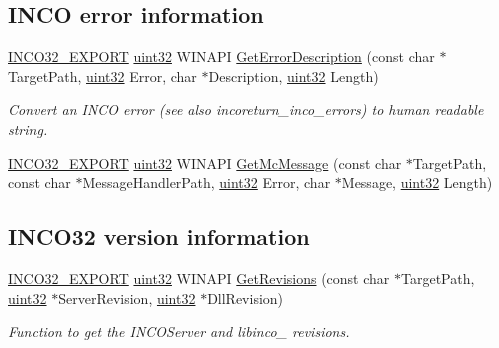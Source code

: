 \subsection*{I\+N\+CO error information}
\begin{DoxyCompactItemize}
\item 
\hyperlink{inco__32_8h_a09505cad5bbb66fc36750a4fbca0444b}{I\+N\+C\+O32\+\_\+\+E\+X\+P\+O\+RT} \hyperlink{indeltypes_8h_a4b435a49c74bb91f284f075e63416cb6}{uint32} W\+I\+N\+A\+PI \hyperlink{group__commonfunctions_ga2ce71629197df864b4ca9121feaff795}{Get\+Error\+Description} (const char $\ast$Target\+Path, \hyperlink{indeltypes_8h_a4b435a49c74bb91f284f075e63416cb6}{uint32} Error, char $\ast$Description, \hyperlink{indeltypes_8h_a4b435a49c74bb91f284f075e63416cb6}{uint32} Length)
\begin{DoxyCompactList}\small\item\em Convert an I\+N\+CO error (see also incoreturn\+\_\+inco\+\_\+errors) to human readable string. \end{DoxyCompactList}\item 
\hyperlink{inco__32_8h_a09505cad5bbb66fc36750a4fbca0444b}{I\+N\+C\+O32\+\_\+\+E\+X\+P\+O\+RT} \hyperlink{indeltypes_8h_a4b435a49c74bb91f284f075e63416cb6}{uint32} W\+I\+N\+A\+PI \hyperlink{group__commonfunctions_gae35d1b67b8052ac2411a9c899141854f}{Get\+Mc\+Message} (const char $\ast$Target\+Path, const char $\ast$Message\+Handler\+Path, \hyperlink{indeltypes_8h_a4b435a49c74bb91f284f075e63416cb6}{uint32} Error, char $\ast$Message, \hyperlink{indeltypes_8h_a4b435a49c74bb91f284f075e63416cb6}{uint32} Length)
\end{DoxyCompactItemize}
\subsection*{I\+N\+C\+O32 version information}
\begin{DoxyCompactItemize}
\item 
\hyperlink{inco__32_8h_a09505cad5bbb66fc36750a4fbca0444b}{I\+N\+C\+O32\+\_\+\+E\+X\+P\+O\+RT} \hyperlink{indeltypes_8h_a4b435a49c74bb91f284f075e63416cb6}{uint32} W\+I\+N\+A\+PI \hyperlink{group__commonfunctions_gaae80abf7f7bc82fa98428b67da68a366}{Get\+Revisions} (const char $\ast$Target\+Path, \hyperlink{indeltypes_8h_a4b435a49c74bb91f284f075e63416cb6}{uint32} $\ast$Server\+Revision, \hyperlink{indeltypes_8h_a4b435a49c74bb91f284f075e63416cb6}{uint32} $\ast$Dll\+Revision)
\begin{DoxyCompactList}\small\item\em Function to get the I\+N\+C\+O\+Server and libinco\+\_ revisions. \end{DoxyCompactList}\end{DoxyCompactItemize}


